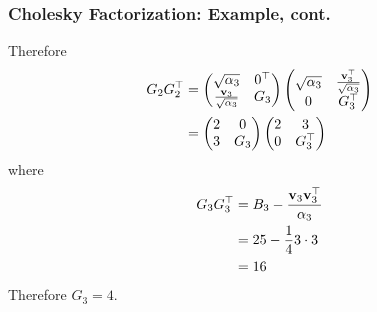 \documentclass{beamer}
\begin{document}
\begin{frame}\frametitle{Cholesky Factorization: Example, cont.}
	Therefore
	\begin{align*}
		G_2 G_2^\top &= \begin{pmatrix}
 				\sqrt{\alpha_3} & 0^\top \\ \frac{\mathbf{v}_3}{\sqrt{\alpha_3}} & G_3
 			 \end{pmatrix}
 			 \begin{pmatrix}
 				\sqrt{\alpha_3} & \frac{\mathbf{v}_3^\top}{\sqrt{\alpha_3}} \\ 0 & G_3^\top
 			 \end{pmatrix} \\
 		&= \begin{pmatrix}
				2 & 0   \\
				3 & G_3 
			\end{pmatrix}
			\begin{pmatrix}
				2 & 3  \\
				0 & G_3^\top 
			\end{pmatrix}
	\end{align*}
	where
	\begin{align*}
		G_3 G_3^\top &= B_3 - \frac{\mathbf{v}_3 \mathbf{v}_3^\top}{\alpha_3} \\
		&= 25 - \frac{1}{4} 3 \cdot 3 \\
 		&= 	16
	\end{align*}
	Therefore $G_3=4$.
\end{frame}
\end{document}
